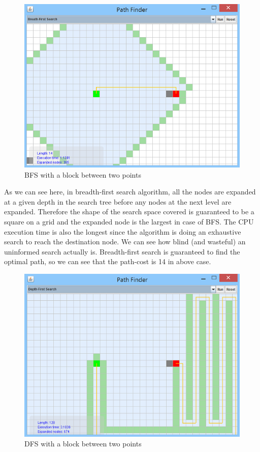 \documentclass[a4paper]{article}
\begin{document}
\begin{figure}[h!]
  \centering
    \includegraphics[scale=.9]{images/bfs1.png}
  \caption{BFS with a block between two points}
\end{figure}

\noindent As we can see here, in breadth-first search algorithm, all the nodes are expanded at a given depth in the search tree before any nodes at the next level are expanded. Therefore the shape of the search space covered is guaranteed to be a square on a grid and the expanded node is the largest in case of BFS. The CPU execution time is also the longest since the algorithm is doing an exhaustive search to reach the destination node. We can see how blind (and wasteful) an uninformed search actually is. Breadth-first search is guaranteed to find the optimal path, so we can see that the path-cost is 14 in above case. \\

\begin{figure}[h!]
  \centering
    \includegraphics[scale=.9]{images/dfs1.png}
  \caption{DFS with a block between two points}
\end{figure}
\end{document}
